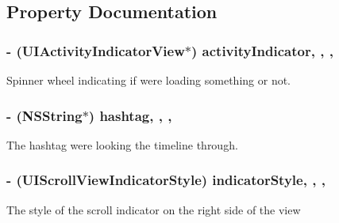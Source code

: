 \subsection{Property Documentation}
\hypertarget{interface_e_s_recent_view_controller_ae155cb84c814b33af8d964161a29a4c7}{}
\subsubsection[{activity\+Indicator}]{\setlength{\rightskip}{0pt plus 5cm}-\/ (U\+I\+Activity\+Indicator\+View$\ast$) activity\+Indicator\hspace{0.3cm}{\ttfamily [read]}, {\ttfamily [write]}, {\ttfamily [nonatomic]}, {\ttfamily [retain]}}\label{interface_e_s_recent_view_controller_ae155cb84c814b33af8d964161a29a4c7}
Spinner wheel indicating if we\textquotesingle{}re loading something or not. \hypertarget{interface_e_s_recent_view_controller_a6e722f2b15d4e7402de0c5d23ba51864}{}
\subsubsection[{hashtag}]{\setlength{\rightskip}{0pt plus 5cm}-\/ (N\+S\+String$\ast$) hashtag\hspace{0.3cm}{\ttfamily [read]}, {\ttfamily [write]}, {\ttfamily [nonatomic]}, {\ttfamily [retain]}}\label{interface_e_s_recent_view_controller_a6e722f2b15d4e7402de0c5d23ba51864}
The hashtag we\textquotesingle{}re looking the timeline through. \hypertarget{interface_e_s_recent_view_controller_ab65543661066860b3cedcf3866d5b2fc}{}
\subsubsection[{indicator\+Style}]{\setlength{\rightskip}{0pt plus 5cm}-\/ (U\+I\+Scroll\+View\+Indicator\+Style) indicator\+Style\hspace{0.3cm}{\ttfamily [read]}, {\ttfamily [write]}, {\ttfamily [nonatomic]}, {\ttfamily [assign]}}\label{interface_e_s_recent_view_controller_ab65543661066860b3cedcf3866d5b2fc}
The style of the scroll indicator on the right side of the view \hypertarget{interface_e_s_recent_view_controller_a4781916b5b111f1570d40cb7af6ff7e8}{}

